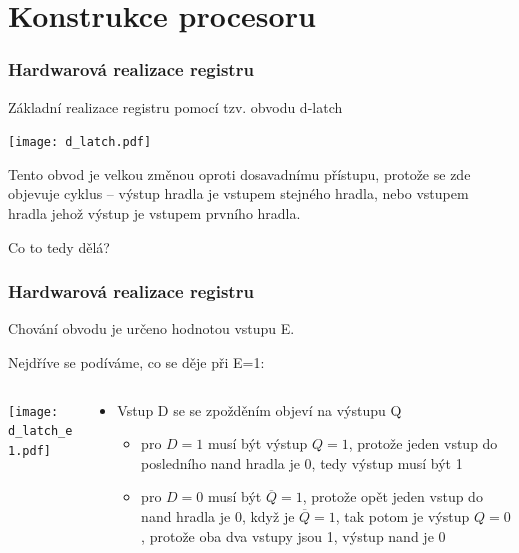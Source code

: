 \documentclass{beamer}
\begin{document}
\section{Konstrukce procesoru}

\begin{frame}
\frametitle{Hardwarová realizace registru}
Základní realizace registru pomocí tzv. obvodu d-latch
\begin{center}
\texttt{[image: d\_latch.pdf]}
\end{center}

Tento obvod je velkou změnou oproti dosavadnímu přístupu, protože se zde objevuje cyklus -- výstup hradla je vstupem stejného hradla, nebo vstupem hradla jehož výstup je vstupem prvního hradla.

Co to tedy dělá?

\end{frame}

\begin{frame}
\frametitle{Hardwarová realizace registru}

Chování obvodu je určeno hodnotou vstupu E.

Nejdříve se podíváme, co se děje při E=1:
\begin{columns}
\begin{column}{0.5\textwidth}
\begin{center}
\texttt{[image: d\_latch\_e1.pdf]}
\end{center}
\end{column}
\begin{column}{0.5\textwidth}  
\begin{itemize}
\item Vstup D se se zpožděním objeví na výstupu Q
\begin{itemize}
\item pro $D=1$ musí být výstup $Q=1$, protože jeden vstup do posledního nand hradla je 0, tedy výstup musí být 1
\item pro $D=0$ musí být $\overline{Q}=1$, protože opět jeden vstup do nand hradla je 0, když je $\overline{Q}=1$, tak potom je výstup $Q=0$, protože oba dva vstupy jsou 1, výstup nand je 0
\end{itemize}
\end{itemize}
\end{column}
\end{columns}

\end{frame}
\end{document}
